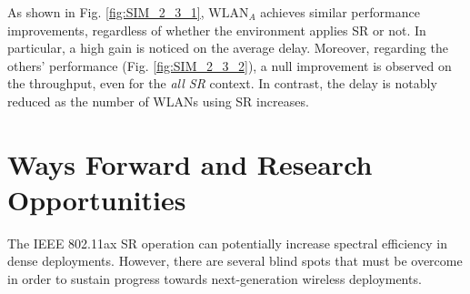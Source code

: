 \documentclass[preprint,12pt]{elsarticle}
\begin{document}
	As shown in Fig. \ref{fig:SIM_2_3_1}, $\text{WLAN}_A$ achieves similar performance improvements, regardless of whether the environment applies SR or not. In particular, a high gain is noticed on the average delay. Moreover, regarding the others' performance (Fig. \ref{fig:SIM_2_3_2}), a null improvement is observed on the throughput, even for the \emph{all SR} context. In contrast, the delay is notably reduced as the number of WLANs using SR increases.
	
	\section{Ways Forward and Research Opportunities}
	\label{section:ways_forwad}
	The IEEE 802.11ax SR operation can potentially increase spectral efficiency in dense deployments. However, there are several blind spots that must be overcome in order to sustain progress towards next-generation wireless deployments. 
	
\end{document}
